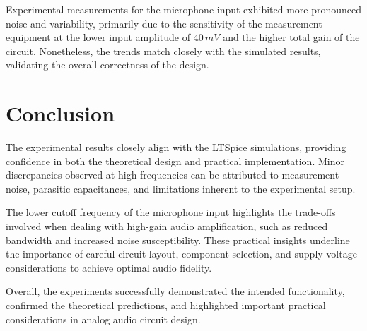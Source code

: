 \documentclass[12pt]{article}
\begin{document}
Experimental measurements for the microphone input exhibited more pronounced noise and variability, primarily due to the sensitivity of the measurement equipment at the lower input amplitude of $40\,mV$ and the higher total gain of the circuit. Nonetheless, the trends match closely with the simulated results, validating the overall correctness of the design.

\section{Conclusion}
The experimental results closely align with the LTSpice simulations, providing confidence in both the theoretical design and practical implementation. Minor discrepancies observed at high frequencies can be attributed to measurement noise, parasitic capacitances, and limitations inherent to the experimental setup.

The lower cutoff frequency of the microphone input highlights the trade-offs involved when dealing with high-gain audio amplification, such as reduced bandwidth and increased noise susceptibility. These practical insights underline the importance of careful circuit layout, component selection, and supply voltage considerations to achieve optimal audio fidelity.

Overall, the experiments successfully demonstrated the intended functionality, confirmed the theoretical predictions, and highlighted important practical considerations in analog audio circuit design.
\end{document}

